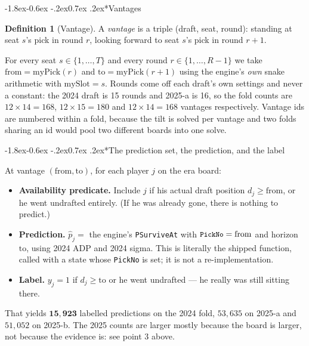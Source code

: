 \documentclass[10pt,a4paper]{article}
\makeatletter
\theoremstyle{plain}
\theoremstyle{definition}
\newtheorem{definition}[theorem]{Definition}
\theoremstyle{remark}
\newcommand{\code}[1]{\texttt{\small #1}}
\renewcommand\subsubsection{\@startsection{subsubsection}{3}{\z@}%
  {-1.8ex\@plus -0.6ex \@minus -.2ex}{0.7ex \@plus .2ex}{\normalfont\normalsize\bfseries}}
\makeatother
\begin{document}
\subsubsection*{Vantages}

\begin{definition}[Vantage]
A \emph{vantage} is a triple (draft, seat, round): standing at seat $s$'s pick in round
$r$, looking forward to seat $s$'s pick in round $r+1$.
\end{definition}

For every seat $s \in \{1,\dots,T\}$ and every round $r \in \{1,\dots,R-1\}$ we take
$\text{from} = \mathrm{myPick}(r)$ and $\text{to} = \mathrm{myPick}(r+1)$ using the
engine's \emph{own} snake arithmetic with $\text{mySlot} = s$. Rounds come off each
draft's own settings and never a constant: the 2024 draft is 15 rounds and 2025-a is 16,
so the fold counts are $12 \times 14 = 168$, $12 \times 15 = 180$ and $12 \times 14 = 168$
vantages respectively. Vantage ids are numbered within a fold, because the tilt is solved
per vantage and two folds sharing an id would pool two different boards into one solve.

\subsubsection*{The prediction set, the prediction, and the label}

At vantage $(\text{from}, \text{to})$, for each player $j$ on the era board:

\begin{itemize}
\item \textbf{Availability predicate.} Include $j$ if his actual draft position
$d_j \ge \text{from}$, or he went undrafted entirely. (If he was already gone, there is
nothing to predict.)
\item \textbf{Prediction.} $\hat p_j = $ the engine's \code{PSurviveAt} with
$\code{PickNo} = \text{from}$ and horizon $\text{to}$, using 2024 ADP and 2024 sigma.
This is literally the shipped function, called with a state whose \code{PickNo} is set;
it is not a re-implementation.
\item \textbf{Label.} $y_j = 1$ if $d_j \ge \text{to}$ or he went undrafted --- he really
was still sitting there.
\end{itemize}

That yields $\mathbf{15{,}923}$ labelled predictions on the 2024 fold, $53{,}635$ on
2025-a and $51{,}052$ on 2025-b. The 2025 counts are larger mostly because the board is
larger, not because the evidence is: see point 3 above.
\end{document}

